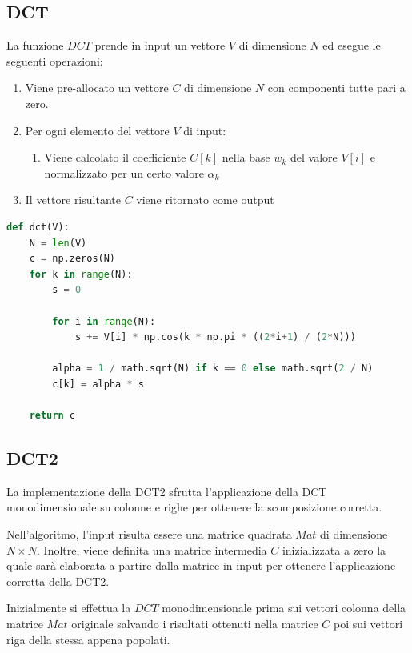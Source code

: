 \documentclass[11pt,italian]{article}
\begin{document}
\subsection{DCT}
La funzione $\mathit{DCT}$ prende in input un vettore $V$ di dimensione $N$ ed esegue le seguenti operazioni:
\begin{enumerate}
    \item Viene pre-allocato un vettore $C$ di dimensione $N$ con componenti tutte pari a zero.
    \item Per ogni elemento del vettore $V$ di input:
    \begin{enumerate}
        \item Viene calcolato il coefficiente $C[k]$ nella base $w_k$ del valore $V[i]$ e normalizzato per un certo valore $\alpha_k$
    \end{enumerate}
    \item Il vettore risultante $C$ viene ritornato come output
\end{enumerate}

\begin{lstlisting}[language=python,emph={math,np},caption=Implementazione della DCT monodimensionale]
def dct(V):
    N = len(V)
    c = np.zeros(N)
    for k in range(N):
        s = 0

        for i in range(N):
            s += V[i] * np.cos(k * np.pi * ((2*i+1) / (2*N)))

        alpha = 1 / math.sqrt(N) if k == 0 else math.sqrt(2 / N)
        c[k] = alpha * s

    return c
\end{lstlisting}

\subsection{DCT2}
\label{section:dct2}
La implementazione della DCT2 sfrutta l'applicazione della DCT monodimensionale su colonne e righe per ottenere la scomposizione corretta.

Nell'algoritmo, l'input risulta essere una matrice quadrata $\mathit{Mat}$ di dimensione $N\times N$. Inoltre, viene definita una matrice intermedia $C$ inizializzata a zero la quale sarà elaborata a partire dalla matrice in input per ottenere l'applicazione corretta della DCT2.

Inizialmente si effettua la $\mathit{DCT}$ monodimensionale prima sui vettori colonna della matrice $Mat$ originale salvando i risultati ottenuti nella matrice $C$ poi sui vettori riga della stessa appena popolati.
\end{document}
